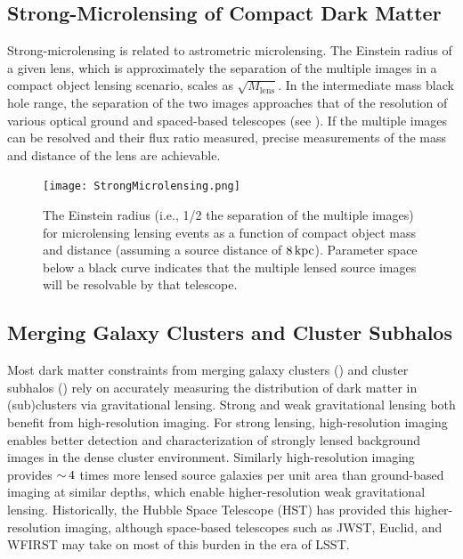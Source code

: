 
\subsection{Strong-Microlensing of Compact Dark Matter }
Strong-microlensing is related to astrometric microlensing.
The Einstein radius of a given lens, which is approximately the separation of the multiple images in a compact object lensing scenario, scales as $\sqrt{M_\mathrm{lens}}$.
In the intermediate mass black hole range, the separation of the two images approaches that of the resolution of various optical ground and spaced-based telescopes (see ).
If the multiple images can be resolved and their flux ratio measured, precise measurements of the mass and distance of the lens are achievable.

\begin{figure}
\label{fig:strong_microlensing}
\centering
\texttt{[image: StrongMicrolensing.png]}
\caption{The Einstein radius (i.e., 1/2 the separation of the multiple images) for microlensing lensing events as a function of compact object mass and distance (assuming a source distance of $8\mathrm{\,kpc}$). Parameter space below a black curve indicates that the multiple lensed source images will be resolvable by that telescope. }
\end{figure}

\subsection{Merging Galaxy Clusters and Cluster Subhalos}

Most dark matter constraints from merging galaxy clusters () and cluster subhalos () rely on accurately measuring the distribution of dark matter in (sub)clusters via gravitational lensing.
Strong and weak gravitational lensing both benefit from high-resolution imaging.
For strong lensing, high-resolution imaging enables better detection and characterization of strongly lensed background images in the dense cluster environment.
Similarly high-resolution imaging provides $ {\sim}\,4$ times more lensed source galaxies per unit area than ground-based imaging at similar depths, which enable higher-resolution weak gravitational lensing.
Historically, the Hubble Space Telescope (HST) has provided this higher-resolution imaging, although space-based telescopes such as JWST, Euclid, and WFIRST may take on most of this burden in the era of LSST.


